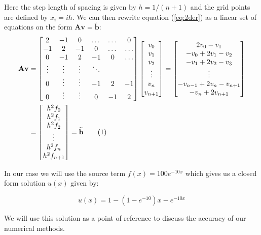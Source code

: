 \documentclass[norsk,a4paper,12pt]{article}
\newcommand\numberthis{\addtocounter{equation}{1}\tag{\theequation}}
\begin{document}
 Here the step length of spacing is given by $h=1/(n+1)$ and the grid points are defined by $x_i=ih$. We can then rewrite equation (\ref{eq:2der}) as a linear set of equations on the form $\textbf{A}\textbf{v}=\tilde{\textbf{b}}$:
\begin{align*}
\textbf{A}\textbf{v}&= \begin{bmatrix} 2 & -1 & 0 & \dots & \dots & 0 \\ -1 & 2 & -1 & 0 & \dots & \dots \\ 0 & -1 & 2 & -1 & 0 & \dots \\ \vdots & \vdots & \vdots & \ddots \\ 0 & \vdots & \vdots & -1 & 2 & -1 \\ 0 & \vdots & \vdots & 0 & -1 & 2  \end{bmatrix}
\begin{bmatrix} v_0 \\ v_1\\ v_2\\ \vdots \\ v_n \\ v_{n+1} \end{bmatrix}=\begin{bmatrix} 2v_0 - v_1 \\ -v_0+2v_1-v_2 \\ -v_1+2v_2-v_3 \\ \vdots \\ -v_{n-1}+2v_n-v_{n+1} \\ -v_n+2v_{n+1}
\end{bmatrix}\\ &=
\begin{bmatrix}h^2f_0 \\ h^2f_1\\ h^2f_2\\ \vdots \\ h^2f_n\\ h^2f_{n+1}\end{bmatrix} = \widetilde{\textbf{b}} \numberthis \label{eq:lineq}
\end{align*}

In our case we will use the source term $f(x)=100e^{-10x}$ which gives us a closed form solution $u(x)$ given by:

\begin{equation}
u(x)=1-(1-e^{-10})x-e^{-10x}
\label{eq:d_i}
\end{equation}

We will use this solution as a point of reference to discuss the accuracy of our numerical methods. 
\end{document}

